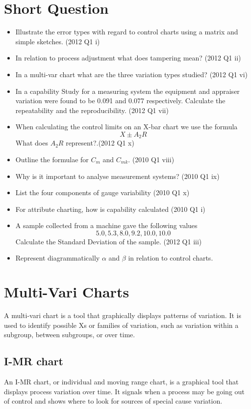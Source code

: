 \documentclass[]{article}
\begin{document}


\section{Short Question}
\begin{itemize}
\item Illustrate the error types with regard to control charts using a matrix and simple sketches.  (2012 Q1 i)

\item In relation to process adjustment what does tampering mean? (2012 Q1 ii)

\item In a multi-var chart what are the three variation types studied? (2012 Q1 vi)

\item In a capability Study for a measuring 
system the equipment and appraiser variation were found to be 0.091 and 0.077 respectively.
Calculate the repeatability and the reproducibility. (2012 Q1 vii)

\item When calculating the control limits on an X-bar chart we use the formula
\[ X \pm A_2R\] What does $A_2R$ represent?.(2012 Q1 x)

\item Outline the formulae for $C_m$ and $C_{mk}$. (2010 Q1 viii)

\item Why is it important to analyse measurement systems? (2010 Q1 ix)

\item List the four components of gauge variability (2010 Q1 x)

\item For attribute charting, how is capability calculated (2010 Q1 i)

\item A sample collected from a machine gave the following values
\[ 5.0, 5.3, 8.0, 9.2, 10.0, 10.0\]
Calculate the Standard Deviation of the sample. (2012 Q1 iii)

\item Represent diagrammatically $\alpha$ and $\beta$ in relation to control charts.
\end{itemize}

\section{Multi-Vari Charts}

A multi-vari chart is a tool that graphically displays patterns of variation. It is used to identify possible Xs or families of variation, such as variation within a subgroup, between subgroups, or over time. 

\subsection{I-MR chart}

An I-MR chart, or individual and moving range chart, is a graphical tool that displays process variation over time. It signals when a process may be going out of control and shows where to look for sources of special cause variation.
\end{document}
